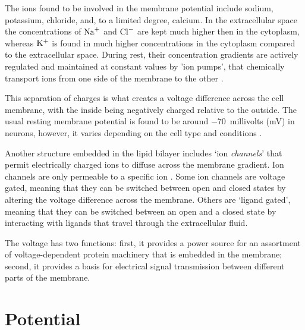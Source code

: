 \documentclass[../../Orator]{subfiles}
\begin{document}
The ions found to be involved in the membrane potential include sodium, potassium, chloride, and, to a limited degree, calcium\footnotemark. 
In the extracellular space the concentrations of \(\mathrm{Na}^+\) and  \(\mathrm{Cl}^-\) are kept much higher then in the cytoplasm, whereas \(\mathrm{K}^+\) is found in much higher concentrations  in the cytoplasm compared to the extracellular space. During rest, their concentration gradients are actively regulated and maintained at constant values by 'ion pumps', that chemically transport ions from one side of the membrane to the other \cite{}. 

This separation of charges is what creates a voltage difference across the cell membrane, with the inside being negatively charged relative to the outside. The usual resting membrane potential is found to be around \qty{-70}{millivolts} (\unit{\milli\volt}) in neurons, however, it varies depending on the cell type and conditions \cite{}. 

Another structure embedded in the lipid bilayer includes `ion \textit{channels}' that permit electrically charged ions to diffuse across the membrane gradient. Ion channels are only permeable to a specific ion \cite{}. Some ion channels are voltage gated, meaning that they can be switched between open and closed states by altering the voltage difference across the membrane. 
Others are `ligand gated', meaning that they can be switched between an open and a closed state by interacting with ligands that travel through the extracellular fluid. 

\vspace{1em}


The voltage has two functions: first, it provides a power source for an assortment of voltage-dependent protein machinery that is embedded in the membrane; second, it provides a basis for electrical signal transmission between different parts of the membrane.



\section{Potential}
\end{document}
